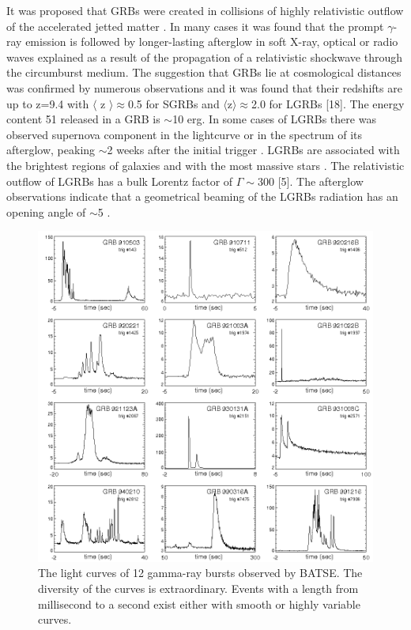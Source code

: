 \documentclass[12pt, a4paper,titlepage]{article}
\numberwithin{equation}{section}
\numberwithin{figure}{section}
\begin{document}
It was proposed that GRBs were created in collisions of highly relativistic outflow of the accelerated jetted matter \cite{grb10}. In many cases it was found that the prompt $\gamma$-ray emission is followed by longer-lasting afterglow in soft X-ray, optical or radio waves \cite{grb11} explained as a result of the propagation of a relativistic shockwave through the circumburst medium. The suggestion that GRBs lie at cosmological distances \cite{grb12} was confirmed by numerous observations and it was found that their redshifts are up to z=9.4 with $\langle$ z $\rangle\approx$0.5 for SGRBs and $\langle$z$\rangle \approx$2.0 for LGRBs [18]. The energy content 51 released in a GRB is $\sim$10 erg.
In some cases of LGRBs there was observed supernova component in the lightcurve or in the spectrum of its afterglow, peaking $\sim$2 weeks after the initial trigger \cite{grb13}. LGRBs are associated with the brightest regions of galaxies and with the most massive stars \cite{grb14}. The relativistic outflow of LGRBs has a bulk Lorentz factor of $\Gamma\sim$300 [5]. The afterglow observations indicate that a geometrical beaming of the LGRBs radiation has an opening angle of $\sim$5 \cite{grb15}.

\begin{figure}[H]
\centering
\includegraphics[width=130.0mm]{images/GRB_BATSE_12lightcurves.png}
\caption{The light curves of 12 gamma-ray bursts observed by BATSE. The diversity of the curves is extraordinary. Events with a length from millisecond to a second exist either with smooth or highly variable curves.}
\end{figure}
\end{document}
